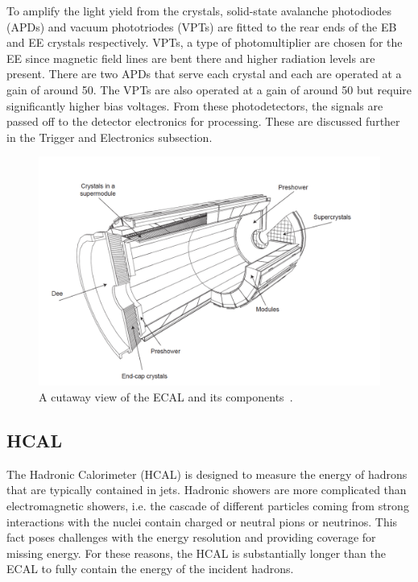 To amplify the light yield from the crystals, solid-state avalanche photodiodes (APDs) and vacuum phototriodes (VPTs) are fitted to the rear ends of the EB and EE crystals respectively. VPTs, a type of photomultiplier are chosen for the EE since magnetic field lines are bent there and higher radiation levels are present. There are two APDs that serve each crystal and each are operated at a gain of around 50. The VPTs are also operated at a gain of around 50 but require significantly higher bias voltages. From these photodetectors, the signals are passed off to the detector electronics for processing. These are discussed further in the Trigger and Electronics subsection. 

\begin{figure}[htbp!]
    \caption{A cutaway view of the ECAL and its components~\cite{Chatrchyan:2008aa}.}
    \begin{center}
        \includegraphics[scale=0.7]{fig/cutawayECAL.png}
    \end{center}
    \label{fig:cutawayECAL}
\end{figure}



\subsection{HCAL}
The Hadronic Calorimeter (HCAL) is designed to measure the energy of hadrons that are typically contained in jets. Hadronic showers are more complicated than electromagnetic showers, i.e. the cascade of different particles coming from strong interactions with the nuclei contain charged or neutral pions or neutrinos. This fact poses challenges with the energy resolution and providing coverage for missing energy. For these reasons, the HCAL is substantially longer than the ECAL to fully contain the energy of the incident hadrons. 

